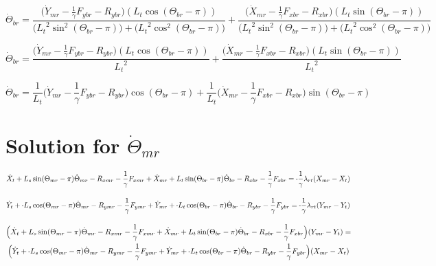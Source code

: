 \documentclass[11pt, landscape]{article}
\newcommand{\mn}{\scalebox{0.7}[1.0]{-}}
\begin{document}
\begin{equation}
\dot{\Theta}_{br} =
\frac{\Big(\dot{Y}_{mr} - \frac{1}{\gamma}F_{ybr} - R_{ybr} \Big)(L_{t}\cos(\Theta_{br}-\pi))}
{\Big( {L_{t}}^2\sin^2(\Theta_{br}-\pi)\Big) + \Big ({L_{t}}^2\cos^2(\Theta_{br}-\pi) \Big)}
+ \frac{\Big(\dot{X}_{mr} - \frac{1}{\gamma}F_{xbr} - R_{xbr} \Big)(L_{t}\sin(\Theta_{br}-\pi))}
{\Big ({L_{t}}^2\sin^2(\Theta_{br}-\pi) \Big) + \Big( {L_{t}}^2\cos^2(\Theta_{br}-\pi) \Big) }
\end{equation}

\begin{equation}
\dot{\Theta}_{br} =
\frac{\Big(\dot{Y}_{mr} - \frac{1}{\gamma}F_{ybr} - R_{ybr} \Big)(L_{t}\cos(\Theta_{br}-\pi))}
{{L_{t}}^2}
+ \frac{\Big(\dot{X}_{mr} - \frac{1}{\gamma}F_{xbr} - R_{xbr} \Big)(L_{t}\sin(\Theta_{br}-\pi))}
{{L_{t}}^2}
\end{equation}

\begin{equation}
\dot{\Theta}_{br} =
\frac{1}{L_{t}}\Big(\dot{Y}_{mr} - \frac{1}{\gamma}F_{ybr} - R_{ybr} \Big)\cos(\Theta_{br}-\pi)
+ \frac{1}{L_{t}}\Big(\dot{X}_{mr} - \frac{1}{\gamma}F_{xbr} - R_{xbr} \Big)\sin(\Theta_{br}-\pi)
\end{equation}





\section{Solution for $\dot{\Theta}_{mr}$}

\begin{equation}
\dot{X}_{t } + L_{s}\sin(\Theta_{mr}-\pi)  \dot{\Theta}_{mr} - R_{xmr} - \frac{1}{\gamma}F_{xmr} + 
\dot{X}_{mr} + L_{t}\sin(\Theta_{br}-\pi)  \dot{\Theta}_{br} - R_{xbr} - \frac{1}{\gamma}F_{xbr} = \mn\frac{1}{\gamma}\lambda_{rt}(X_{mr} - X_{t })
\end{equation}

\begin{equation}
\dot{Y}_{t } + \mn L_{s}\cos(\Theta_{mr}-\pi)  \dot{\Theta}_{mr} - R_{ymr} - \frac{1}{\gamma}F_{ymr} +
\dot{Y}_{mr} + \mn L_{t}\cos(\Theta_{br}-\pi)  \dot{\Theta}_{br} - R_{ybr} - \frac{1}{\gamma}F_{ybr} = \mn\frac{1}{\gamma}\lambda_{rt}(Y_{mr} - Y_{t })
\end{equation}

\begin{multline}
\Big ( \dot{X}_{t } + L_{s}\sin(\Theta_{mr}-\pi)  \dot{\Theta}_{mr} - R_{xmr} - \frac{1}{\gamma}F_{xmr} 
+ \dot{X}_{mr} + L_{t}\sin(\Theta_{br}-\pi)  \dot{\Theta}_{br} - R_{xbr} - \frac{1}{\gamma}F_{xbr} \Big ) (Y_{mr} - Y_{t }) = \\
\Big ( \dot{Y}_{t } + \mn L_{s}\cos(\Theta_{mr}-\pi)  \dot{\Theta}_{mr} - R_{ymr} - \frac{1}{\gamma}F_{ymr}
+ \dot{Y}_{mr} + \mn L_{t}\cos(\Theta_{br}-\pi)  \dot{\Theta}_{br} - R_{ybr} - \frac{1}{\gamma}F_{ybr} \Big ) (X_{mr} - X_{t })
\end{multline}
\end{document}

